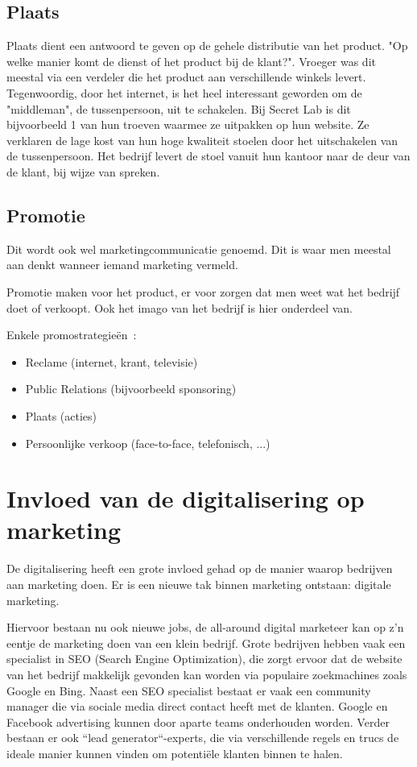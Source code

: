 \subsection{Plaats} \label{sec:marketing-plaats}
Plaats dient een antwoord te geven op de gehele distributie van het product. "Op welke manier komt de dienst of het product bij de klant?". Vroeger was dit meestal via een verdeler die het product aan verschillende winkels levert. Tegenwoordig, door het internet, is het heel interessant geworden om de "middleman", de tussenpersoon, uit te schakelen. Bij Secret Lab is dit bijvoorbeeld 1 van hun troeven waarmee ze uitpakken op hun website. Ze verklaren de lage kost van hun hoge kwaliteit stoelen door het uitschakelen van de tussenpersoon. Het bedrijf levert de stoel vanuit hun kantoor naar de deur van de klant, bij wijze van spreken. 

\subsection{Promotie} \label{sec:marketing-promotie}
Dit wordt ook wel marketingcommunicatie genoemd. Dit is waar men meestal aan denkt wanneer iemand marketing vermeld.

Promotie maken voor het product, er voor zorgen dat men weet wat het bedrijf doet of verkoopt. Ook het imago van het bedrijf is hier onderdeel van.

Enkele promostrategieën~\autocite{marketingscriptie.nl2018}:
\begin{itemize}
	\item Reclame (internet, krant, televisie)
	\item Public Relations (bijvoorbeeld sponsoring)
	\item Plaats (acties)
	\item Persoonlijke verkoop (face-to-face, telefonisch, ...)
\end{itemize}

\section{Invloed van de digitalisering op marketing} \label{sec:digitalisering-marketing}
De digitalisering heeft een grote invloed gehad op de manier waarop bedrijven aan marketing doen. Er is een nieuwe tak binnen marketing ontstaan: digitale marketing. 

Hiervoor bestaan nu ook nieuwe jobs, de all-around digital marketeer kan op z'n eentje de marketing doen van een klein bedrijf. Grote bedrijven hebben vaak een specialist in SEO (Search Engine Optimization), die zorgt ervoor dat de website van het bedrijf makkelijk gevonden kan worden via populaire zoekmachines zoals Google en Bing. Naast een SEO specialist bestaat er vaak een community manager die via sociale media direct contact heeft met de klanten. Google en Facebook advertising kunnen door aparte teams onderhouden worden. Verder bestaan er ook ``lead generator``-experts, die via verschillende regels en trucs de ideale manier kunnen vinden om potentiële klanten binnen te halen.

